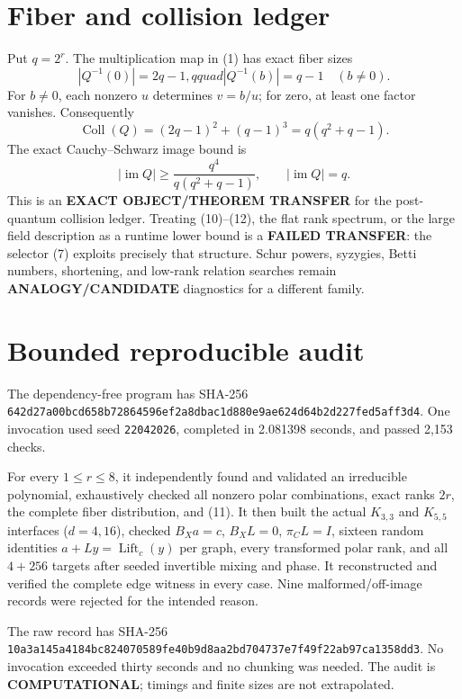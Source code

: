 \documentclass[11pt]{article}
\newcommand{\COMP}{\textbf{COMPUTATIONAL}}
\begin{document}
\section{Fiber and collision ledger}
Put $q=2^r$.  The multiplication map in (1) has exact fiber sizes
\[
 |Q^{-1}(0)|=2q-1,qquad |Q^{-1}(b)|=q-1\quad(b\ne0).      \tag{10}
\]
For $b\ne0$, each nonzero $u$ determines $v=b/u$; for zero, at least one
factor vanishes.  Consequently
\[
 \operatorname{Coll}(Q)
 =(2q-1)^2+(q-1)^3=q(q^2+q-1).                           \tag{11}
\]
The exact Cauchy--Schwarz image bound is
\[
 |\operatorname{im}Q|\ge \frac{q^4}{q(q^2+q-1)},
 \qquad |\operatorname{im}Q|=q.                         \tag{12}
\]
This is an \textbf{EXACT OBJECT/THEOREM TRANSFER} for the post-quantum
collision ledger.  Treating (10)--(12), the flat rank spectrum, or the large
field description as a runtime lower bound is a \textbf{FAILED TRANSFER}:
the selector (7) exploits precisely that structure.  Schur powers, syzygies,
Betti numbers, shortening, and low-rank relation searches remain
\textbf{ANALOGY/CANDIDATE} diagnostics for a different family.

\section{Bounded reproducible audit}
The dependency-free program
has SHA-256
\texttt{642d27a00bcd658b72864596ef2a8dbac1d880e9ae624d64b2d227fed5aff3d4}.
One invocation used seed \texttt{22042026}, completed in 2.081398 seconds,
and passed 2,153 checks.

For every $1\le r\le8$, it independently found and validated an irreducible
polynomial, exhaustively checked all nonzero polar combinations, exact ranks
$2r$, the complete fiber distribution, and (11).  It then built the actual
$K_{3,3}$ and $K_{5,5}$ interfaces ($d=4,16$), checked $B_Xa=c$,
$B_XL=0$, $\pi_CL=I$, sixteen random identities $a+Ly=\operatorname{Lift}_c(y)$
per graph, every transformed polar rank, and all $4+256$ targets after seeded
invertible mixing and phase.  It reconstructed and verified the complete edge
witness in every case.  Nine malformed/off-image records were rejected for
the intended reason.

The raw record
has SHA-256
\texttt{10a3a145a4184bc824070589fe40b9d8aa2bd704737e7f49f22ab97ca1358dd3}.
No invocation exceeded thirty seconds and no chunking was needed.  The audit
is \COMP{}; timings and finite sizes are not extrapolated.
\end{document}
